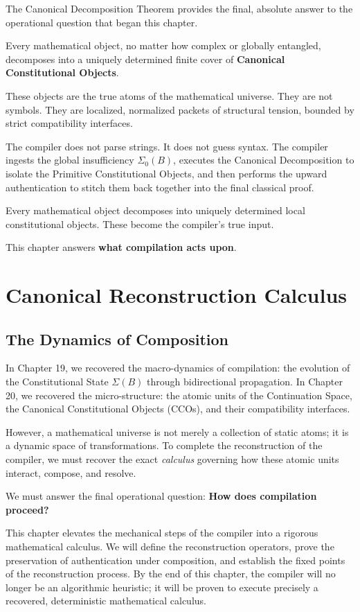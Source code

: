 \documentclass[12pt,openany]{extbook}
\theoremstyle{plain}
\theoremstyle{definition}
\begin{document}
The Canonical Decomposition Theorem provides the final, absolute answer to the operational question that began this chapter. 

Every mathematical object, no matter how complex or globally entangled, decomposes into a uniquely determined finite cover of \textbf{Canonical Constitutional Objects}. 

These objects are the true atoms of the mathematical universe. They are not symbols. They are localized, normalized packets of structural tension, bounded by strict compatibility interfaces. 

The compiler does not parse strings. It does not guess syntax. The compiler ingests the global insufficiency $\Sigma_0(B)$, executes the Canonical Decomposition to isolate the Primitive Constitutional Objects, and then performs the upward authentication to stitch them back together into the final classical proof.

Every mathematical object decomposes into uniquely determined local constitutional objects. These become the compiler's true input.

This chapter answers \textbf{what compilation acts upon}.

\chapter{Canonical Reconstruction Calculus}

\section{The Dynamics of Composition}

In Chapter 19, we recovered the macro-dynamics of compilation: the evolution of the Constitutional State $\Sigma(B)$ through bidirectional propagation. In Chapter 20, we recovered the micro-structure: the atomic units of the Continuation Space, the Canonical Constitutional Objects (CCOs), and their compatibility interfaces.

However, a mathematical universe is not merely a collection of static atoms; it is a dynamic space of transformations. To complete the reconstruction of the compiler, we must recover the exact \emph{calculus} governing how these atomic units interact, compose, and resolve. 

We must answer the final operational question: \textbf{How does compilation proceed?}

This chapter elevates the mechanical steps of the compiler into a rigorous mathematical calculus. We will define the reconstruction operators, prove the preservation of authentication under composition, and establish the fixed points of the reconstruction process. By the end of this chapter, the compiler will no longer be an algorithmic heuristic; it will be proven to execute precisely a recovered, deterministic mathematical calculus.
\end{document}
